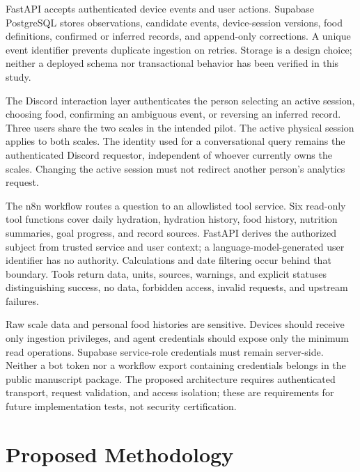 \documentclass[conference]{IEEEtran}
\begin{document}
FastAPI accepts authenticated device events and user actions. Supabase PostgreSQL stores observations, candidate events, device-session versions, food definitions, confirmed or inferred records, and append-only corrections. A unique event identifier prevents duplicate ingestion on retries. Storage is a design choice; neither a deployed schema nor transactional behavior has been verified in this study.

The Discord interaction layer authenticates the person selecting an active session, choosing food, confirming an ambiguous event, or reversing an inferred record. Three users share the two scales in the intended pilot. The active physical session applies to both scales. The identity used for a conversational query remains the authenticated Discord requestor, independent of whoever currently owns the scales. Changing the active session must not redirect another person's analytics request.

The n8n workflow routes a question to an allowlisted tool service. Six read-only tool functions cover daily hydration, hydration history, food history, nutrition summaries, goal progress, and record sources. FastAPI derives the authorized subject from trusted service and user context; a language-model-generated user identifier has no authority. Calculations and date filtering occur behind that boundary. Tools return data, units, sources, warnings, and explicit statuses distinguishing success, no data, forbidden access, invalid requests, and upstream failures.

Raw scale data and personal food histories are sensitive. Devices should receive only ingestion privileges, and agent credentials should expose only the minimum read operations. Supabase service-role credentials must remain server-side. Neither a bot token nor a workflow export containing credentials belongs in the public manuscript package. The proposed architecture requires authenticated transport, request validation, and access isolation; these are requirements for future implementation tests, not security certification.

\section{Proposed Methodology}\label{sec:method}
\end{document}
